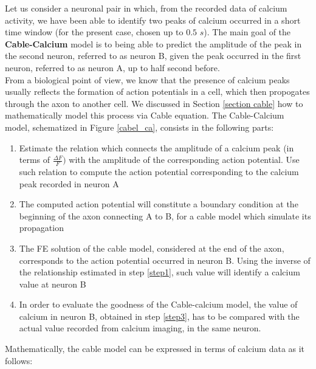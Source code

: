 \documentclass[12pt, a4paper]{report}
\begin{document}
Let us consider a neuronal pair in which, from the recorded data of calcium activity, we have been able to identify two peaks of calcium occurred in a short time window (for the present case, chosen up to $0.5$ $s$). The main goal of the 
\textbf{Cable-Calcium} model is to being able to predict the amplitude of the peak in the second neuron, referred to as neuron B, given the peak occurred in the first neuron, referred to as neuron A, up to half second before.\\
From a biological point of view, we know that the presence of calcium peaks usually reflects the formation of action potentials in a cell, which then propogates through the axon to another cell. We discussed in Section \ref{section cable} how to mathematically model this process via Cable equation. The Cable-Calcium model, schematized in Figure \ref{cabel_ca}, consists in the following parts:

\begin{enumerate}
	
	\item Estimate the relation which connects the amplitude of a calcium peak (in terms of $\frac{\Delta F}{F})$ with the amplitude of the corresponding action potential. Use such relation to compute the action potential corresponding to the calcium peak recorded in neuron A \label{step1}
	
	\item The computed action potential will constitute a boundary condition at the beginning of the axon connecting A to B, for a cable model which simulate its propagation 
	
	\item The FE solution of the cable model, considered at the end of the axon, corresponds to the action potential occurred in neuron B. Using the inverse of the relationship estimated in step \ref{step1}, such value will identify a calcium value at neuron B \label{step3}
	
	\item In order to evaluate the goodness of the Cable-calcium model, the value of calcium in neuron B, obtained in step \ref{step3},  has to be compared with the actual value recorded from calcium imaging, in the same neuron.
	
\end{enumerate}


Mathematically, the cable model can be expressed in terms of calcium data as it follows:
\end{document}
